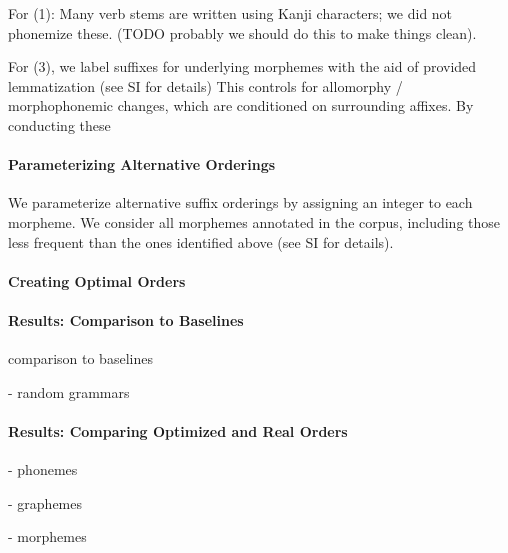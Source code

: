 For (1): Many verb stems are written using Kanji characters; we did not phonemize these. (TODO probably we should do this to make things clean).


For (3), we label suffixes for underlying morphemes with the aid of provided lemmatization (see SI for details)
This controls for allomorphy / morphophonemic changes, which are conditioned on surrounding affixes.
By conducting these 

\paragraph{Parameterizing Alternative Orderings}

We parameterize alternative suffix orderings by assigning an integer to each morpheme.
We consider all morphemes annotated in the corpus, including those less frequent than the ones identified above (see SI for details).

\paragraph{Creating Optimal Orders}

\paragraph{Results: Comparison to Baselines}
comparison to baselines

- random grammars

\paragraph{Results: Comparing Optimized and Real Orders}

- phonemes

- graphemes

- morphemes

